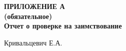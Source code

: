 {}%
\par

\normalsize
\begin{center}
  \textbf{ПРИЛОЖЕНИЕ А} \\
  \textbf{(обязательное)} \\
  \textbf{Отчет о проверке на заимствование}
\end{center}

\renewcommand{\thefigure}{А.\arabic{figure}} %
\setcounter{figure}{0}                       %


\begin{flushright}
  \begin{minipage}{0.5\textwidth}
    \raggedright
    \underline{\hspace*{3.7cm}} Кривальцевич Е.А.
  \end{minipage}
\end{flushright}



% 

\pdfpagewidth=210mm
\pdfpageheight=297mm

\clearpage

